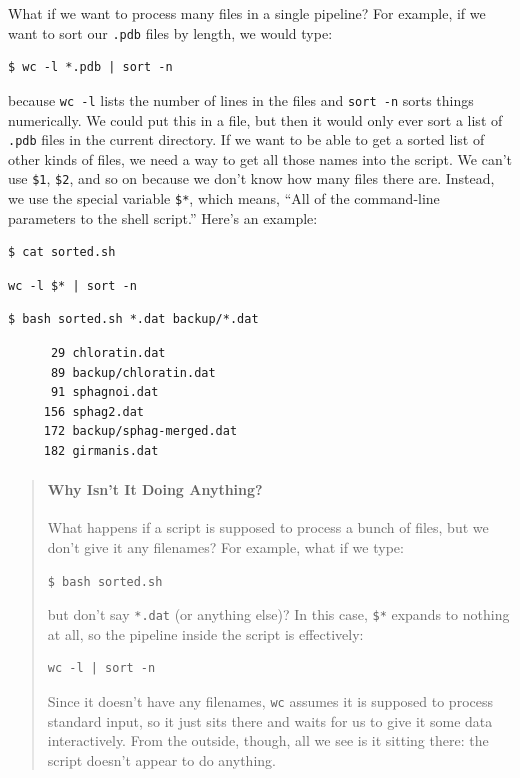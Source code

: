 \documentclass{book}
\begin{document}
What if we want to process many files in a single pipeline? For example,
if we want to sort our \texttt{.pdb} files by length, we would type:

\begin{verbatim}
$ wc -l *.pdb | sort -n
\end{verbatim}

because \texttt{wc -l} lists the number of lines in the files and
\texttt{sort -n} sorts things numerically. We could put this in a file,
but then it would only ever sort a list of \texttt{.pdb} files in the
current directory. If we want to be able to get a sorted list of other
kinds of files, we need a way to get all those names into the script. We
can't use \texttt{\$1}, \texttt{\$2}, and so on because we don't know
how many files there are. Instead, we use the special variable
\texttt{\$*}, which means, ``All of the command-line parameters to the
shell script.'' Here's an example:

\begin{verbatim}
$ cat sorted.sh
\end{verbatim}

\begin{verbatim}
wc -l $* | sort -n
\end{verbatim}

\begin{verbatim}
$ bash sorted.sh *.dat backup/*.dat
\end{verbatim}

\begin{verbatim}
      29 chloratin.dat
      89 backup/chloratin.dat
      91 sphagnoi.dat
     156 sphag2.dat
     172 backup/sphag-merged.dat
     182 girmanis.dat
\end{verbatim}

\begin{quote}
\mbox{}\paragraph{Why Isn't It Doing Anything?}

What happens if a script is supposed to process a bunch of files, but we
don't give it any filenames? For example, what if we type:

\begin{verbatim}
$ bash sorted.sh
\end{verbatim}

but don't say \texttt{*.dat} (or anything else)? In this case,
\texttt{\$*} expands to nothing at all, so the pipeline inside the
script is effectively:

\begin{verbatim}
wc -l | sort -n
\end{verbatim}

Since it doesn't have any filenames, \texttt{wc} assumes it is supposed
to process standard input, so it just sits there and waits for us to
give it some data interactively. From the outside, though, all we see is
it sitting there: the script doesn't appear to do anything.
\end{quote}
\end{document}
